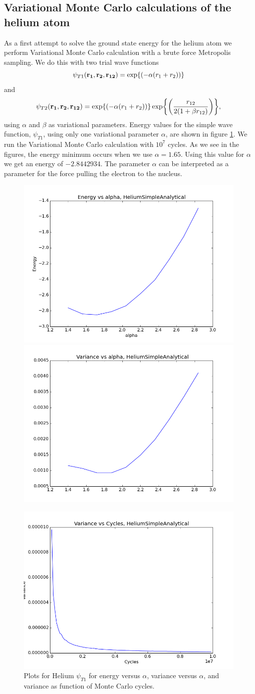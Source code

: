 \subsection{Variational Monte Carlo calculations of the helium atom}
		As a first attempt to solve the ground state energy for the helium
		atom we perform Variational Monte Carlo calculation with a brute force
		Metropolis sampling. We do this with two trial wave functions
		\[
		\psi_{T1}({\bf r_{1}},{\bf r_{2}},{\bf r_{12}})=\exp{\left(-\alpha(r_{1}+r_{2})\right)}
		\]
		and
		\[
		\psi_{T2}({\bf r_{1}},{\bf r_{2}},{\bf r_{12}})=\exp{\left(-\alpha(r_{1}+r_{2})\right)}\exp{\left(\frac{r_{12}}{2(1+\beta r_{12})}\right)},
		\]
		using $\alpha$ and $\beta$ as variational parameters. Energy values
		for the simple wave function, $\psi_{T1}$, using only one variational
		parameter $\alpha$, are shown in figure \ref{fig01:alpha_Simple}.
		We run the Variational Monte Carlo calculation with $10^{7}$ cycles.
		As we see in the figures, the energy minimum occurs when we use $\alpha=1.65$.
		Using this value for $\alpha$ we get an energy of $-2.8442934$.
		The parameter $\alpha$ can be interpreted as a parameter for the
		force pulling the electron to the nucleus.


	\begin{figure}
	\centering \includegraphics[width=0.45\linewidth]{../figures/EnergyVsAlphaHeliumSimpleAnalytical}
	\includegraphics[width=0.45\linewidth]{../figures/VarianceVsAlphaHeliumSimpleAnalytical}

	\includegraphics[width=0.45\linewidth]{../figures/VarianceNCyclesHeliumSimpleAnalytical}\protect\protect\caption{Plots for Helium $\psi_{T1}$ for energy versus $\alpha$, variance versus $\alpha$, and variance as function of Monte Carlo cycles.}
	\label{fig01:alpha_Simple}
	\end{figure}


